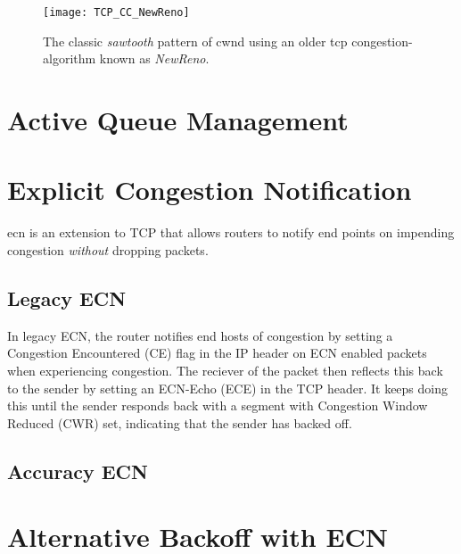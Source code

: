 \begin{figure}[H]
    \centering
    \texttt{[image: TCP\_CC\_NewReno]}
    \captionsetup{width=0.6\textwidth}
    \caption{The classic \textit{sawtooth} pattern of \gls{cwnd} using an older \gls{tcp} congestion-algorithm known as \textit{NewReno}. }
\end{figure}





\section{Active Queue Management}



\section{Explicit Congestion Notification}

\gls{ecn} is an extension to TCP that allows routers to notify end points on impending congestion \textit{without} dropping packets.

\subsection{Legacy ECN}

In legacy ECN, the router notifies end hosts of congestion by setting a Congestion Encountered (CE) flag in the IP header on ECN enabled packets when experiencing congestion. The reciever of the packet then reflects this back to the sender by setting an ECN-Echo (ECE) in the TCP header. It keeps doing this until the sender responds back with a segment with Congestion Window Reduced (CWR) set, indicating that the sender has backed off.

\subsection{Accuracy ECN}

\section{Alternative Backoff with ECN}

